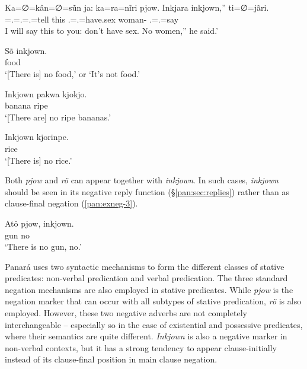 \documentclass[output=paper,colorlinks,citecolor=brown,draft]{langscibook}
\begin{document}
\ea\label{pan:stat-ink1}  
    Ka=∅=kân=∅=sũn ja: ka=ra=nĩri pjow. Inkjara inkjown,'' ti=∅=jãri. \\
    {\db}\Irr{}=\Fsg.\Irr{}=\Ssg.\Dat{}=\Fsg.\Irr{}=tell this \Ssg.\Erg{}=\Tpl.\Abs{}=have.sex \Neg{} woman-\Pl{} \Neg{} \Tsg.\Erg{}=\Tsg.\Abs{}=say  \\
    I will say this to you: don't have sex. No women,'' he said.' \\
\z

\ea\label{pan:stat-ink2}
    \gll Sõ inkjown. \\
    food \Neg{} \\
    \glt `[There is] no food,' or `It's not food.' \\
\z

\ea\label{pan:stat-ink-ini1}
    \gll Inkjown pakwa kjokjo. \\
    \Neg{} banana ripe \\
    \glt `[There are] no ripe bananas.' \\
\z

\ea\label{pan:stat-ink-ini2}
    \gll Inkjown kjorinpe. \\
    \Neg{} rice \\
    \glt `[There is] no rice.' \\
\z

Both \textit{pjow} and \textit{rö} can appear together with \textit{inkjown}. In such cases, \textit{inkjown} should be seen in its negative reply function (\S\ref{pan:sec:replies}) rather than as clause-final negation (\ref{pan:exneg-3}).

\ea\label{pan:exneg-3}
\gll Atö pjow, inkjown. \\
 gun \Neg{} no \\
\glt `There is no gun, no.' \\
\z

Panará uses two syntactic mechanisms to form the different classes of stative predicates: non-verbal predication and verbal predication. The three standard negation mechanisms are also employed in stative predicates. While \textit{pjow} is the negation marker that can occur with all subtypes of stative predication, \textit{rö} is also employed. However, these two negative adverbs are not completely interchangeable -- especially so in the case of existential and possessive predicates, where their semantics are quite different. \textit{Inkjown} is also a negative marker in non-verbal contexts, but it has a strong tendency to appear clause-initially instead of its clause-final position in main clause negation.
\end{document}
